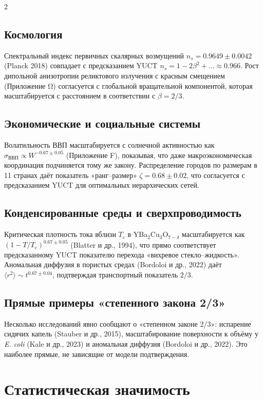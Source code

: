 \documentclass[11pt,a4paper]{article}
\newcommand{\betaf}{\beta}
\begin{document}
\begin{multicols}{2}
		\subsection{Космология}
		Спектральный индекс первичных скалярных возмущений \(n_s = 0.9649\pm0.0042\) (Planck 2018) совпадает с предсказанием YUCT \(n_s = 1 - 2\betaf^2 + \dots \approx 0.966\). Рост дипольной анизотропии реликтового излучения с красным смещением (Приложение Ω) согласуется с глобальной вращательной компонентой, которая масштабируется с расстоянием в соответствии с \(\betaf = 2/3\).
		
		\subsection{Экономические и социальные системы}
		Волатильность ВВП масштабируется с солнечной активностью как \(\sigma_{\text{ВВП}} \propto W^{-0.67\pm0.05}\) (Приложение F), показывая, что даже макроэкономическая координация подчиняется тому же закону. Распределение городов по размерам в 11 странах даёт показатель «ранг–размер» \(\zeta = 0.68\pm0.02\), что согласуется с предсказанием YUCT для оптимальных иерархических сетей.
		
		\subsection{Конденсированные среды и сверхпроводимость}
		Критическая плотность тока вблизи \(T_c\) в YBa\(_2\)Cu\(_3\)O\(_{7-\delta}\) масштабируется как \((1-T/T_c)^{0.67\pm0.05}\) (Blatter и др., 1994), что прямо соответствует предсказанному YUCT показателю перехода «вихревое стекло–жидкость». Аномальная диффузия в пористых средах (Bordoloi и др., 2022) даёт \(\langle r^2 \rangle \sim t^{0.67\pm0.04}\), подтверждая транспортный показатель \(2/3\).
		
		\subsection{Прямые примеры «степенного закона 2/3»}
		Несколько исследований явно сообщают о «степенном законе 2/3»: испарение сидячих капель (Stauber и др., 2015), масштабирование поверхности к объёму у \emph{E. coli} (Kale и др., 2023) и аномальная диффузия (Bordoloi и др., 2022). Это наиболее прямые, не зависящие от модели подтверждения.
		
		\section{Статистическая значимость}
		

\end{multicols}
\end{document}
